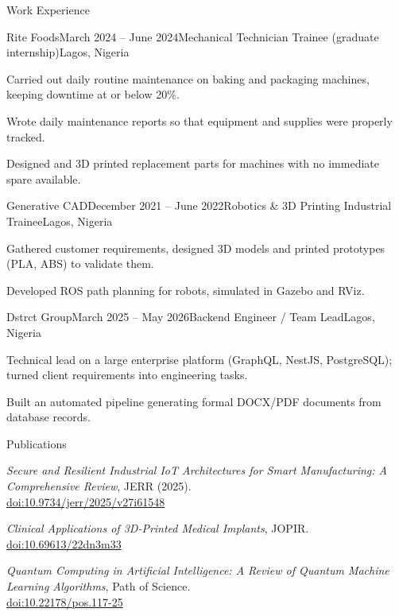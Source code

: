 \documentclass{resume}
\begin{document}
\begin{rSection}{Work Experience}

\begin{rSubsection}{Rite Foods}{March 2024 -- June 2024}{Mechanical Technician Trainee (graduate internship)}{Lagos, Nigeria}
\item Carried out daily routine maintenance on baking and packaging machines, keeping downtime at or below 20\%.
\item Wrote daily maintenance reports so that equipment and supplies were properly tracked.
\item Designed and 3D printed replacement parts for machines with no immediate spare available.
\end{rSubsection}

\begin{rSubsection}{Generative CAD}{December 2021 -- June 2022}{Robotics \& 3D Printing Industrial Trainee}{Lagos, Nigeria}
\item Gathered customer requirements, designed 3D models and printed prototypes (PLA, ABS) to validate them.
\item Developed ROS path planning for robots, simulated in Gazebo and RViz.
\end{rSubsection}

\begin{rSubsection}{Dstrct Group}{March 2025 -- May 2026}{Backend Engineer / Team Lead}{Lagos, Nigeria}
\item Technical lead on a large enterprise platform (GraphQL, NestJS, PostgreSQL); turned client requirements into engineering tasks.
\item Built an automated pipeline generating formal DOCX/PDF documents from database records.
\end{rSubsection}

\end{rSection}



\begin{rSection}{Publications}
\item \textit{Secure and Resilient Industrial IoT Architectures for Smart Manufacturing: A Comprehensive Review}, JERR (2025).\\ \href{https://doi.org/10.9734/jerr/2025/v27i61548}{doi:10.9734/jerr/2025/v27i61548}
\item \textit{Clinical Applications of 3D-Printed Medical Implants}, JOPIR.\\ \href{https://doi.org/10.69613/22dn3m33}{doi:10.69613/22dn3m33}
\item \textit{Quantum Computing in Artificial Intelligence: A Review of Quantum Machine Learning Algorithms}, Path of Science.\\ \href{http://dx.doi.org/10.22178/pos.117-25}{doi:10.22178/pos.117-25}
\end{rSection}
\end{document}
